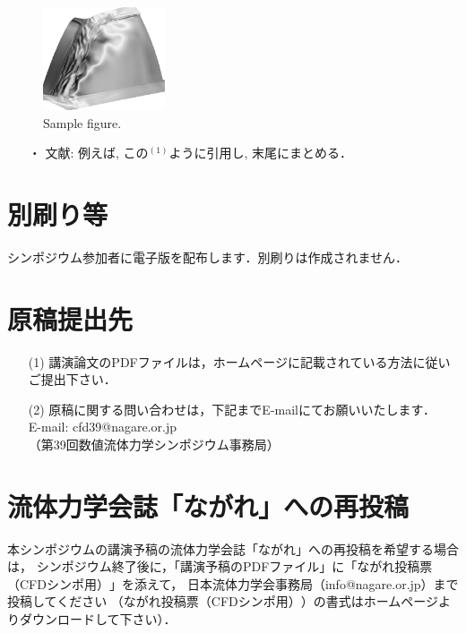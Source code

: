 \documentclass[a4j]{jarticle}
\begin{document}
\begin{figure}[b]
    \vspace*{-5mm}
    \begin{center}
        \includegraphics[width=0.32\textwidth,clip]{sample.eps}
    \end{center}
    \caption{Sample figure.}
    \vspace*{-5mm}
\end{figure}

\begin{enumerate}
    \item[・] 文献:
        例えば, この$^{(1)}$ように引用し, 末尾にまとめる．
\end{enumerate}

\section{別刷り等}

シンポジウム参加者に電子版を配布します．別刷りは作成されません．

\section{原稿提出先}

\begin{enumerate}
    \item[(1)] 
    講演論文のPDFファイルは，ホームページに記載されている方法に従いご提出下さい．
    \item[(2)]
    原稿に関する問い合わせは，下記までE-mailにてお願いいたします．\\
E-mail: cfd39@nagare.or.jp\\
（第39回数値流体力学シンポジウム事務局）

\end{enumerate}

\section{流体力学会誌「ながれ」への再投稿}
本シンポジウムの講演予稿の流体力学会誌「ながれ」への再投稿を希望する場合は，
シンポジウム終了後に，「講演予稿のPDFファイル」に「ながれ投稿票（CFDシンポ用）$\!\!$」を添えて，
日本流体力学会事務局（info@nagare.or.jp）まで投稿してください
（ながれ投稿票（CFDシンポ用）$\!\!$）の書式はホームページよりダウンロードして下さい）．
\end{document}
